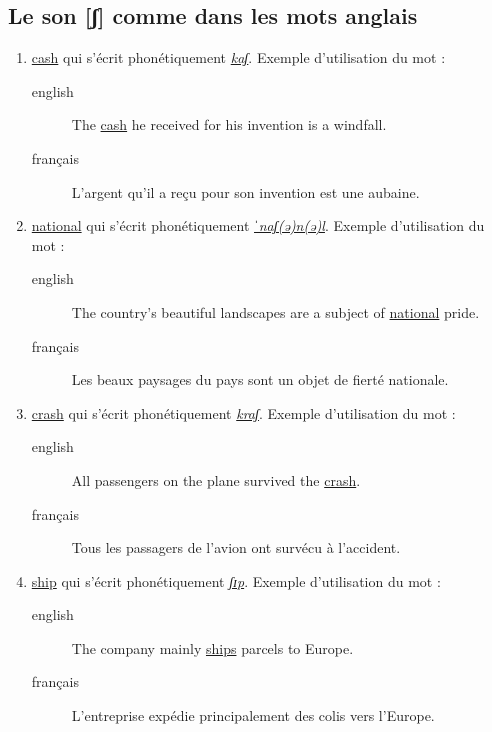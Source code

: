 \documentclass[12pt,a4paper]{book}
\begin{document}
\subsection{Le son [ʃ] comme dans les mots anglais}
\label{sec:org8d21030}
\begin{enumerate}
\item \href{http://www.wordreference.com/enfr/cash}{cash} qui s'écrit phonétiquement \href{https://en.oxforddictionaries.com/definition/cash}{\emph{kaʃ}}. Exemple d'utilisation du mot :
\begin{description}
\item[{english}] \textenglish{The \href{https://youtu.be/4ahHWROn8M0}{cash} he received for his invention is a windfall.}
\item[{français}] L'argent qu'il a reçu pour son invention est une aubaine.
\end{description}
\item \href{http://www.wordreference.com/enfr/national}{national} qui s'écrit phonétiquement \href{https://en.oxforddictionaries.com/definition/national}{\emph{ˈnaʃ(ə)n(ə)l}}. Exemple d'utilisation du mot : 
\begin{description}
\item[{english}] \textenglish{The country's beautiful landscapes are a subject of
\href{https://youtu.be/xZvzCOQ-TPA}{national} pride.}
\item[{français}] Les beaux paysages du pays sont un objet de fierté
nationale.
\end{description}
\item \href{http://www.wordreference.com/enfr/crash}{crash} qui s'écrit phonétiquement \href{https://en.oxforddictionaries.com/definition/crash}{\emph{kraʃ}}. Exemple d'utilisation du mot :
\begin{description}
\item[{english}] \textenglish{All passengers on the plane survived the \href{https://youtu.be/Jw81bRYUzVM}{crash}.}
\item[{français}] Tous les passagers de l'avion ont survécu à
l'accident.
\end{description}
\item \href{http://www.wordreference.com/enfr/ship}{ship} qui s'écrit phonétiquement \href{https://en.oxforddictionaries.com/definition/ship}{\emph{ʃɪp}}. Exemple d'utilisation du mot :
\begin{description}
\item[{english}] \textenglish{The company mainly \href{https://youtu.be/LLkGsfOfgUw}{ships} parcels to Europe.}
\item[{français}] L'entreprise expédie principalement des colis vers
l'Europe.
\end{description}
\end{enumerate}
\end{document}
